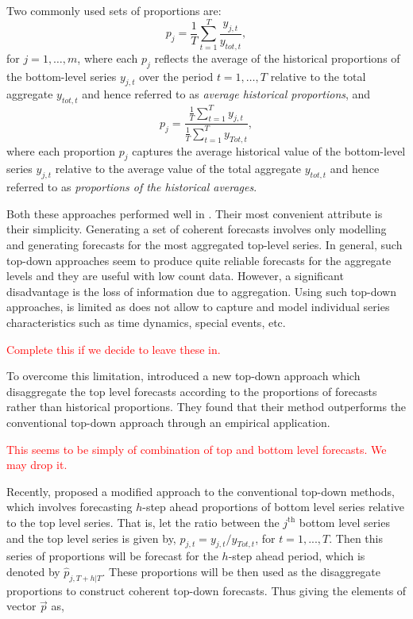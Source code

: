 \documentclass[graybox]{svmult}
\begin{document}
Two commonly used sets of proportions are:
\begin{equation*}
p_j = \frac{1}{T} \sum_{t=1}^{T}\frac{y_{j,t}}{y_{tot,t}},
\end{equation*}
for $j=1,\ldots,m$, where each $p_j$ reflects the average of the historical proportions of the bottom-level series $y_{j,t}$ over the period $t=1,\ldots,T$ relative to the total aggregate $y_{tot,t}$ and hence referred to as \textit{average historical proportions}, and
\begin{equation}
p_j = \frac{\frac{1}{T}\sum_{t=1}^{T}y_{j,t}}{\frac{1}{T}\sum_{t=1}^{T}y_{Tot,t}},
\end{equation}
where each proportion $p_j$ captures the average historical value of the bottom-level series $y_{j,t}$ relative to the average value of the total aggregate $y_{tot,t}$ and hence referred to as \textit{proportions of the historical averages}.

Both these approaches performed well in \cite{gross1990}. Their most convenient attribute is their simplicity. Generating a set of coherent forecasts involves only modelling and generating forecasts for the most aggregated top-level series. In general, such top-down approaches seem to produce quite reliable forecasts for the aggregate levels and they are useful with low count data. However, a significant disadvantage is the loss of information due to aggregation. Using such top-down approaches, is limited as does not allow to capture and model individual series characteristics such as time dynamics, special events, etc.

\textcolor{red}{Complete this if we decide to leave these in.}

To overcome this limitation, \cite{AthEtAl2009} introduced a new top-down approach which disaggregate the top level forecasts according to the proportions of forecasts rather than historical proportions. They found that their method outperforms the conventional top-down approach through an empirical application.

\textcolor{red}{This seems to be simply of combination of top and bottom level forecasts. We may drop it. }

Recently, \cite{Mircetic2017} proposed a modified approach to the conventional top-down methods, which involves forecasting $h$-step ahead proportions of bottom level series relative to the top level series. That is, let the ratio between the $j^\text{th}$ bottom level series and the top level series is given by, $p_{j,t}=y_{j,t}/y_{Tot,t}$, for $t=1,...,T$. Then this series of proportions will be forecast for the $h$-step ahead period, which is denoted by $\hat{p}_{j,T+h|T}$. These proportions will be then used as the disaggregate proportions to construct coherent top-down forecasts. Thus giving the elements of vector $\vec{p}$ as,
\end{document}
